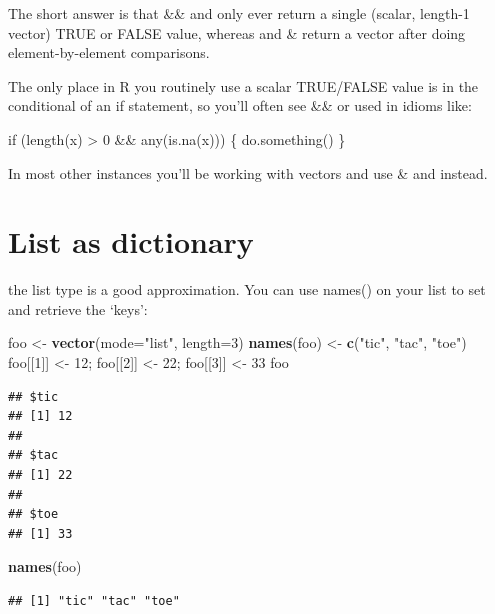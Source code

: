\documentclass[]{book}
\makeatletter
\newenvironment{Shaded}{\begin{snugshade}}{\end{snugshade}}
\newcommand{\DataTypeTok}[1]{\textcolor[rgb]{0.13,0.29,0.53}{#1}}
\newcommand{\DecValTok}[1]{\textcolor[rgb]{0.00,0.00,0.81}{#1}}
\newcommand{\KeywordTok}[1]{\textcolor[rgb]{0.13,0.29,0.53}{\textbf{#1}}}
\newcommand{\NormalTok}[1]{#1}
\newcommand{\StringTok}[1]{\textcolor[rgb]{0.31,0.60,0.02}{#1}}
\newenvironment{kframe}{%
\medskip{}
\setlength{\fboxsep}{.8em}
 \def\at@end@of@kframe{}%
 \ifinner\ifhmode%
  \def\at@end@of@kframe{\end{minipage}}%
  \begin{minipage}{\columnwidth}%
 \fi\fi%
 \def\FrameCommand##1{\hskip\@totalleftmargin \hskip-\fboxsep
 \colorbox{shadecolor}{##1}\hskip-\fboxsep
     \hskip-\linewidth \hskip-\@totalleftmargin \hskip\columnwidth}%
 \MakeFramed {\advance\hsize-\width
   \@totalleftmargin\z@ \linewidth\hsize
   \@setminipage}}%
 {\par\unskip\endMakeFramed%
 \at@end@of@kframe}
\renewenvironment{Shaded}{\begin{kframe}}{\end{kframe}}
\makeatother
\begin{document}
The short answer is that \&\& and \textbar{}\textbar{} only ever return a single (scalar, length-1 vector) TRUE or FALSE value, whereas \textbar{} and \& return a vector after doing element-by-element comparisons.

The only place in R you routinely use a scalar TRUE/FALSE value is in the conditional of an if statement, so you'll often see \&\& or \textbar{}\textbar{} used in idioms like:

if (length(x) \textgreater{} 0 \&\& any(is.na(x))) \{ do.something() \}

In most other instances you'll be working with vectors and use \& and \textbar{} instead.

\hypertarget{list-as-dictionary}{%
\section{List as dictionary}\label{list-as-dictionary}}

the list type is a good approximation. You can use names() on your list to set and retrieve the `keys':

\begin{Shaded}
\begin{Highlighting}[]
\NormalTok{foo <-}\StringTok{ }\KeywordTok{vector}\NormalTok{(}\DataTypeTok{mode=}\StringTok{"list"}\NormalTok{, }\DataTypeTok{length=}\DecValTok{3}\NormalTok{)}
\KeywordTok{names}\NormalTok{(foo) <-}\StringTok{ }\KeywordTok{c}\NormalTok{(}\StringTok{"tic"}\NormalTok{, }\StringTok{"tac"}\NormalTok{, }\StringTok{"toe"}\NormalTok{)}
\NormalTok{foo[[}\DecValTok{1}\NormalTok{]] <-}\StringTok{ }\DecValTok{12}\NormalTok{; foo[[}\DecValTok{2}\NormalTok{]] <-}\StringTok{ }\DecValTok{22}\NormalTok{; foo[[}\DecValTok{3}\NormalTok{]] <-}\StringTok{ }\DecValTok{33}
\NormalTok{foo}
\end{Highlighting}
\end{Shaded}

\begin{verbatim}
## $tic
## [1] 12
## 
## $tac
## [1] 22
## 
## $toe
## [1] 33
\end{verbatim}

\begin{Shaded}
\begin{Highlighting}[]
\KeywordTok{names}\NormalTok{(foo)}
\end{Highlighting}
\end{Shaded}

\begin{verbatim}
## [1] "tic" "tac" "toe"
\end{verbatim}
\end{document}
